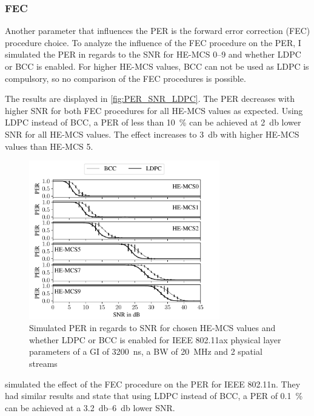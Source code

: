 \subsubsection*{\acf{FEC}}
Another parameter that influences the \ac{PER} is the forward error correction (FEC) procedure choice. To
analyze the influence of the FEC procedure on the \ac{PER}, I simulated the \ac{PER} in regards to the \ac{SNR} for \ac{HE}-\ac{MCS}
\numrange{0}{9} and whether \ac{LDPC} or \ac{BCC} is enabled. For higher \ac{HE}-\ac{MCS} values, \ac{BCC} can not be used as \ac{LDPC} is compulsory, so no comparison of the \ac{FEC} procedures is possible.

The results are displayed in \autoref{fig:PER_SNR_LDPC}. The \ac{PER} decreases with higher \ac{SNR} for both \ac{FEC} procedures for all \ac{HE}-\ac{MCS} values as
expected. Using \ac{LDPC} instead of \ac{BCC}, a \ac{PER} of less than \SI{10}{\percent} can be achieved at \SI{2}{\decibel} lower \ac{SNR}
for all \ac{HE}-\ac{MCS} values. The effect increases to \SI{3}{\decibel} with higher \ac{HE}-\ac{MCS} values than \ac{HE}-\ac{MCS} \num{5}.
\begin{figure}[H]%
   \centering
   \includegraphics[width=0.74\textwidth]{figures/LDPC_PER_to_SNR.pdf}
   \caption{Simulated \ac{PER} in regards to \ac{SNR} for chosen \ac{HE}-\ac{MCS} values and whether \acf{LDPC} or
   \acf{BCC} is enabled for IEEE 802.11ax physical layer parameters of a \ac{GI} of \SI{3200}{\nano\second},
      a \ac{BW} of \SI{20}{\mega\hertz} and 2 spatial streams}%
   \label{fig:PER_SNR_LDPC}%
\end{figure}

\textcite{syafei_performance_2009} simulated the effect of the \ac{FEC} procedure on the \ac{PER} for IEEE 802.11n. They
had similar results and state that using \ac{LDPC} instead of \ac{BCC}, a \ac{PER} of \SI{0.1}{\percent}  can be achieved at a
\SIrange{3.2}{6}{\decibel} lower \ac{SNR}.

